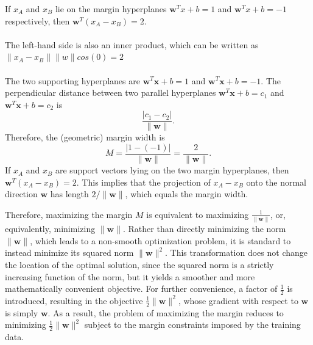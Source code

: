 \documentclass{article}
\begin{document}
If $x_A$ and $x_B$ lie on the margin hyperplanes
$\mathbf{w}^T x + b = 1$ and $\mathbf{w}^T x + b = -1$ respectively, then $\mathbf{w}^T(x_A-x_B)=2$.\\~\\
The left-hand side is also an inner product, which can be written as $\| x_A - x_B \|\| w \|cos(0) = 2$\\~\\
The two supporting hyperplanes are \(\mathbf{w}^T\mathbf{x}+b=1\) and \(\mathbf{w}^T\mathbf{x}+b=-1\).
The perpendicular distance between two parallel hyperplanes \(\mathbf{w}^T\mathbf{x}+b=c_1\) and \(\mathbf{w}^T\mathbf{x}+b=c_2\) is
\[
\frac{|c_1-c_2|}{\|\mathbf{w}\|}.
\]
Therefore, the (geometric) margin width is
\[
M = \frac{|1-(-1)|}{\|\mathbf{w}\|} = \frac{2}{\|\mathbf{w}\|}.
\]
If \(x_A\) and \(x_B\) are support vectors lying on the two margin hyperplanes, then \(\mathbf{w}^T(x_A-x_B)=2\). This implies that the projection of \(x_A-x_B\) onto the normal direction \(\mathbf{w}\) has length \(2/\|\mathbf{w}\|\), which equals the margin width.

Therefore, maximizing the margin $M$ is equivalent to maximizing $\frac{1}{\|\mathbf{w}\|}$, or, equivalently, minimizing $\|\mathbf{w}\|$. Rather than directly minimizing the norm $\|\mathbf{w}\|$, which leads to a non-smooth optimization problem, it is standard to instead minimize its squared norm $\|\mathbf{w}\|^2$. This transformation does not change the location of the optimal solution, since the squared norm is a strictly increasing function of the norm, but it yields a smoother and more mathematically convenient objective. For further convenience, a factor of $\frac{1}{2}$ is introduced, resulting in the objective $\frac{1}{2}\|\mathbf{w}\|^2$, whose gradient with respect to $\mathbf{w}$ is simply $\mathbf{w}$. As a result, the problem of maximizing the margin reduces to minimizing $\frac{1}{2}\|\mathbf{w}\|^2$ subject to the margin constraints imposed by the training data.
\end{document}

